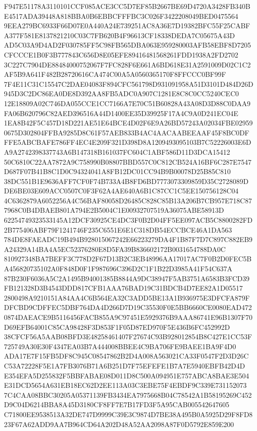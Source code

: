 \documentclass[UTF8,fontset=fandol,zihao=-4,a4paper]{ctexart}
\begin{document}
{{F947E51178A3110101CCF085ACE3CC5D7EF85B2667BE69D4720A3428FB340BE4517ADA39448A818BBA0B6EBBCFFFBC3C026F3422208049BED0475564
9EEA279BC6933F66D07E0A440A24E739251AC8A36E7D19382BFC55F25CABFA377F581E8137821210C03C7FB620B4F96613CF18338DEDA7C05675A43D
AD5C03A9D4AD2F030785FF5C98FB565DBA063E959280003AFB58EBF8D7205CFCCCE1B0F3B777843C656D8E05EFE89416481568261FDD1938A2FD2702
3C227C7904DE88484000752067F7FC828F6E661A6BD618E31A2591009D02C1C2AF5B9A641F482B28720616CA474C00A5A0560365170F8FFCCC0BF99F
7F4E11C31C15547C2DAE04083F894CFC561798D931091958A51D3101D484D26D945D3C2DC86EA0DE8D392AA8FB5ADC0A907C1281E8C8C0CC5240CEC0
12E18809A02C746DA055CCE1CC7166A7E70C51B60828A43A08D3D88C0DAA9FA06B620796C82AED396516A44D1400EE35D39925F17A4C9A0D241EC04E
1EA8B42F5C457D18D221AE51E64BCE4D02F6E9A26BD57243A02034FBE029590675D302804FFBA9285D8C61F57AEB833B4AC4AACAABEEAAF45F8BC0DF
FFE5ABCBAFE786FF4EC4E209F321D398D8A1209493095103B7C52226003E6DA9A2742398337743A6B147318B161037FC604C1ABF586D11D3DCA15412
50C6810C22AA7872A9C758990B08807BBD557C0C812CB524A16BF6C287E7547D687F07B41B8C1D0C94324041A8FB12DC01CC94B9B00078D25B85C810
38DC551B1E9636AFF7CF0F74B733A4B8FD6BD7773073309859D35C2728089DDE6BE03E609ACC0507C0F3F62A4AE640A6B1C87CC1C5EE150756128C04
4C6362879A6052256A4C56BAF80058D26485C828C85B13A206B7CB957E718C877968C0B4DBAEB801A794E2B5004C1E00932707519A36075ABE58913D
62254749323533145A12DCF30925CE4DC3F0B2D04FF5EE097ACB5C8800282FD2B775406ABF79F1241746F235C6551E6E1C318DB54ECCBCE46A1DA563
784DE8FAEADC19B494B928015067242E66223279DA4F1B87F7D7C897C882EB9A24329A14BA4A5EC52376280E8D5FA39B836602172B0031654788DA0C
810927348BA7BEFF3C778D2F67D13B2C3EB48996AA17017AC7F0B2D0FEC5BA456820735102A0F848D0F1F987696C396D2C1F1B22D3985A41F54C637A
87B230F6036A5C2A1495B94001385B8844A9DC38947F5AB3751A6583B3FCD39FB121328D3B4543DDD817CFB1AAA76BAD19C31BDCB4D7EE82A1D05517
2800498A9210151A84AA4C6B564EA32C3ADD5BE13A1B936975E3DFCFA879FDFCBD9CDFFEC5DBF764DA4D266D7D19C35530F0E5BB6660CE0080EAD472
0874DAEACE9B5116456FACB855A9C97451E5929376B9AAA86741E96B1307F70D69EFB64001C85CA98428F3D853F1F05D87ED970F5E436B6FC452992D
38CFCF56A5AAB08BFD3E48258461407F27674C93B928012854B8C427E1CC53F725749A30E30F4347EA03B7A444008BBEE4C9BA706FE9BAEE1BA9F4D0
ADA17E7F15FB5DF8C945C08547862B2D4A008A563021CA33F0547F2D3D26CC53A72228F5E1A7FB3076B71A6B251D7F75EFEFE1B7A7E5940EBFB42D4D
E354EFA5D255832F5BBFABAE08D011D8C500A094951E757ABCA8BAE3E504E31DCD5654A631EB18EC62D2EE113A03C3EBE75F4EBDF9C339E731152073
7C4CAA08BBC30205A05371139FB3434EA7975668B04C78542A1B58195269C452D9C04D6214BBA8A45D3180CF8FF7E7B17FD3F5A95CAB005542647605
C71800EE9538513A32DE747D9999C39E3C9874D7BE38A495B0A5925D29F8FD823F67A62ADD9AA7B964CD64A202D48A52AA2098A87F0D5792E859E200
}}
\end{document}
